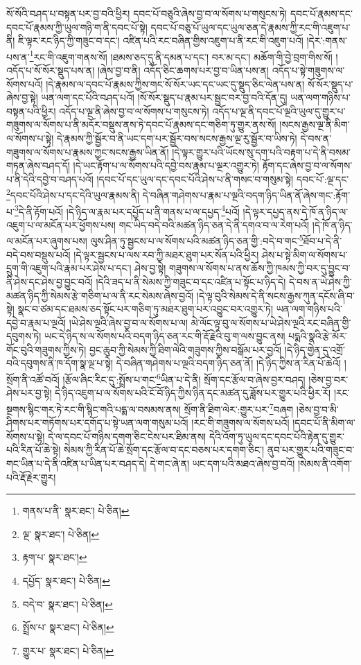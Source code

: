སོ་སོའི་བཤད་པ་བསྟན་པར་བྱ་བའི་ཕྱིར། དབང་པོ་བཅུའི་ཞེས་བྱ་བ་ལ་སོགས་པ་གསུངས་ཏེ། དབང་པོ་རྣམས་དང་དབང་པོ་རྣམས་ཀྱི་ཡུལ་གཉི་ག་ནི་དབང་པོ་སྟེ། དབང་པོ་བཅུ་པོ་ཡུལ་དང་ཡུལ་ཅན་དེ་རྣམས་ཀྱི་རང་གི་འཇུག་པ་ནི། ཇི་ལྟར་རང་ཉིད་ཀྱི་གཟུང་བ་དང་། འཛིན་པའི་རང་བཞིན་གྱིས་འཇུག་པ་ནི་རང་གི་འཇུག་པའོ། །དེར་:གནས་པས་ན་\footnote{གནས་པ་ནི་  སྣར་ཐང་།  པེ་ཅིན། }རང་གི་འཇུག་གནས་སོ། །ཐམས་ཅད་དུ་ནི་དམན་པ་དང་། བར་མ་དང་། མཆོག་གི་བྱེ་བྲག་གིས་སོ། །འདོད་པ་སོ་སོར་སྡུད་པས་ན། །ཞེས་བྱ་བ་ནི། འདོད་ཅིང་ཆགས་པར་བྱ་བ་ཡིན་པས་ན། འདོད་པ་སྟེ་གཟུགས་ལ་སོགས་པའོ། །དེ་རྣམས་ལ་དབང་པོ་རྣམས་ཀྱིས་གང་སོ་སོར་ཡང་དང་ཡང་དུ་སྡུད་ཅིང་ལེན་པས་ན། སོ་སོར་སྡུད་པ་ཞེས་བྱ་སྟེ། ཡན་ལག་དང་པོའི་བཤད་པའོ། །སོ་སོར་སྡུད་པ་རྣམ་པར་སྦྱང་བར་བྱ་བའི་དོན་དུ། ཡན་ལག་གཉིས་པ་བསྟན་པའི་ཕྱིར། འདོད་པ་ལྔ་ནི་ཞེས་བྱ་བ་ལ་སོགས་པ་གསུངས་ཏེ། འདོད་པ་ལྔ་ནི་དབང་པོ་ལྔའི་ཡུལ་དུ་གྱུར་པ་གཟུགས་ལ་སོགས་པ་ནི་མདོར་བསྡུས་ནས་ཏེ་དབང་པོ་རྣམས་དང་གཅིག་ཏུ་གྱུར་ནས་སོ། །སངས་རྒྱས་ལྔ་ནི་མིག་ལ་སོགས་པ་སྟེ། དེ་རྣམས་ཀྱི་སྦྱོར་བ་ནི་ཡང་དག་པར་སྦྱོར་བས་སངས་རྒྱས་ལྔ་རུ་སྦྱོར་བ་ཡིས་ཏེ། དེ་བས་ན་གཟུགས་ལ་སོགས་པ་རྣམས་ཀྱང་སངས་རྒྱས་ཡིན་ནོ། །དེ་ལྟར་གྱུར་པའི་ཡོངས་སུ་དག་པའི་བརྟག་པ་དེ་ནི་བསམ་གཏན་ཞེས་བཤད་དོ། །དེ་ཡང་རྟོག་པ་ལ་སོགས་པའི་དབྱེ་བས་རྣམ་པ་ལྔར་འགྱུར་ཏེ། རྟོག་དང་ཞེས་བྱ་བ་ལ་སོགས་པ་ནི་དེའི་དབྱེ་བ་བཤད་པའོ། །དབང་པོ་དང་ཡུལ་དང་དབང་པོའི་ཤེས་པ་ནི་གསང་བ་གསུམ་སྟེ། དབང་པོ་:ལྔ་དང་\footnote{ལྔ་  སྣར་ཐང་།  པེ་ཅིན། }དབང་པོའི་ཤེས་པ་དང་དེའི་ཡུལ་རྣམས་ནི། དེ་བཞིན་གཤེགས་པ་རྣམ་པ་ལྔའི་བདག་ཉིད་ཡིན་ནོ་ཞེས་གང་:རྟོག་པ་\footnote{རྟག་པ་  སྣར་ཐང་། }དེ་ནི་རྟོག་པའོ། །དེ་ཉིད་ལ་རྣམ་པར་དཔྱོད་པ་ནི་གནས་པ་ལ་དཔྱད་\footnote{དཔྱོད་  སྣར་ཐང་།  པེ་ཅིན། }པའོ། །དེ་ལྟར་དཔྱད་ནས་དེ་ཁོ་ན་ཉིད་ལ་འཇུག་པ་ལ་མངོན་པར་ཕྱོགས་པས། གང་ཡིད་བདེ་བའི་མཚན་ཉིད་ཅན་དེ་ནི་དགའ་བ་ལ་རེག་པའོ། །དེ་ཁོ་ན་ཉིད་ལ་མངོན་པར་ཞུགས་པས། ལུས་ཤིན་ཏུ་སྦྱངས་པ་ལ་སོགས་པའི་མཚན་ཉིད་ཅན་གྱི་:བདེ་བ་གང་\footnote{བདེ་བ་  སྣར་ཐང་།  པེ་ཅིན། }ཐོབ་པ་དེ་ནི་བདེ་བས་བསྡུས་པའོ། །དེ་ལྟར་སྦྱངས་པ་ལས་རབ་ཀྱི་མཐར་ཐུག་པར་སོན་པའི་ཕྱིར། ཤེས་པ་སྟེ་མིག་ལ་སོགས་པ་དྲུག་གི་འཇུག་པའི་རྣམ་པར་ཤེས་པ་དང་། ཤེས་བྱ་སྟེ། གཟུགས་ལ་སོགས་པ་ནས་ཆོས་ཀྱི་ཁམས་ཀྱི་བར་དུ་བྱུང་བ་ནི་ཤེས་དང་ཤེས་བྱ་བྱུང་བའོ། །དེའི་ཟད་པ་ནི་སེམས་ཀྱི་གཟུང་བ་དང་འཛིན་པ་སྟོང་པ་ཉིད་དེ། དེ་བས་ན་ཡེ་ཤེས་ཀྱི་མཚན་ཉིད་ཀྱི་སེམས་རྩེ་གཅིག་པ་ལ་ནི་རང་སེམས་ཞེས་བྱའོ། །དེ་ལྟ་བུའི་སེམས་དེ་ནི་སངས་རྒྱས་ཀུན་དངོས་ཞི་བ་སྟེ། སྣང་བ་ཙམ་དང་ཐམས་ཅད་སྟོང་པར་གཅིག་ཏུ་མཐར་ཐུག་པར་འབྱུང་བར་འགྱུར་ཏེ། ཡན་ལག་གཉིས་པའི་དབྱེ་བ་རྣམ་པ་ལྔའོ། །ཡེ་ཤེས་ལྔའི་ཞེས་བྱ་བ་ལ་སོགས་པ་ལ། མེ་ལོང་ལྟ་བུ་ལ་སོགས་པ་ཡེ་ཤེས་ལྔའི་རང་བཞིན་གྱི་དབུགས་ཏེ། ཡང་དེ་ཉིད་ས་ལ་སོགས་པའི་བདག་ཉིད་ཅན་རང་གི་རྡོ་རྗེའི་བུ་ག་ལས་བྱུང་ནས། པདྨའི་སྣའི་རྩེ་མོར་གོང་བུའི་གཟུགས་ཀྱིས་ཏེ། བྱང་ཆུབ་ཀྱི་སེམས་ཀྱི་ཐིག་ལེའི་གཟུགས་ཀྱིས་བསྒོམ་པར་བྱའོ། །དེ་ཉིད་གྱེན་དུ་འགྲོ་བའི་དབུགས་ནི་ཁ་དོག་སྣ་ལྔ་པ་སྟེ། དེ་བཞིན་གཤེགས་པ་ལྔའི་བདག་ཉིད་ཅན་ནོ། །དེ་ཉིད་ཀྱིས་ན་རིན་པོ་ཆེའོ། །སྲོག་ནི་འཚོ་བའོ། །རྩོལ་ཞིང་རིང་དུ་:སྤྲོས་པ་གང་\footnote{སྤྲོས་པ་  སྣར་ཐང་།  པེ་ཅིན། }ཡིན་པ་དེ་ནི། སྲོག་དང་རྩོལ་བ་ཞེས་བྱར་བཤད། །ཅེས་བྱ་བར་ཤེས་པར་བྱ་སྟེ། དེ་ཉིད་འཇུག་པ་ལ་སོགས་པའི་ངོ་བོ་ཉིད་ཀྱིས་ཉིན་དང་མཚན་དུ་ཟློས་པར་གྱུར་པའི་ཕྱིར་རོ། །རང་སྔགས་སྙིང་གར་ཏེ་རང་གི་སྙིང་གའི་པདྨ་ལ་བསམས་ནས། སྲོག་ནི་ཐིག་ལེར་:གྱུར་པར་\footnote{གྱུར་པ་  སྣར་ཐང་།  པེ་ཅིན། }བཞག །ཅེས་བྱ་བ་མི་ཤིགས་པར་གཏོགས་པར་དགོད་པ་སྟེ་ཡན་ལག་གསུམ་པའོ། །རང་གི་གཟུགས་ལ་སོགས་པའོ། །དབང་པོ་ནི་མིག་ལ་སོགས་པ་སྟེ། དེ་ལ་དབང་པོ་གཉིས་དགག་ཅིང་ངེས་པར་ཐིམ་ནས། དེའི་འོག་ཏུ་ཡུལ་དང་དབང་པོའི་རྟེན་དུ་གྱུར་པའི་རིན་པོ་ཆེ་སྟེ། སེམས་ཀྱི་རིན་པོ་ཆེ་སྲོག་དང་རྩོལ་བ་དང་བཅས་པར་དགག་ཅིང་། ནུབ་པར་གྱུར་པའི་གཟུང་བ་གང་ཡིན་པ་དེ་ནི་འཛིན་པ་ཡིན་པར་བཤད་དེ། དེ་གང་ཞེ་ན། ཡང་དག་པའི་མཐའ་ཞེས་བྱ་བའོ། །སེམས་ནི་འགོག་པའི་རྡོ་རྗེར་གྱུར། 